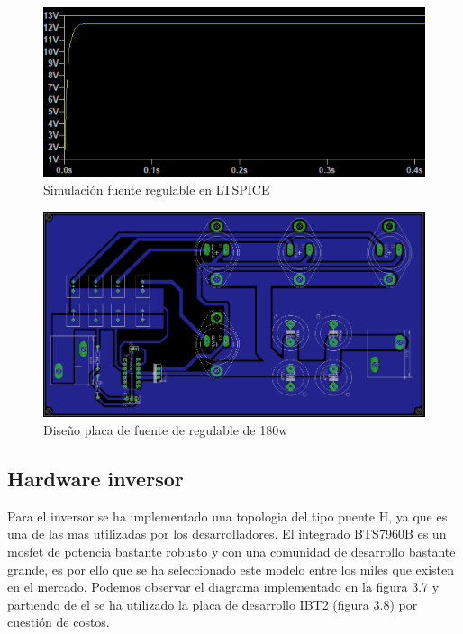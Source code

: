 \begin{figure}[H]
\centering
\includegraphics[width=12cm]{Capitulo3/figs/12v.png}
\caption{Simulación fuente regulable en LTSPICE}
\end{figure}

\begin{figure}[H]
\centering
\includegraphics[width=12cm]{Capitulo3/figs/pcb.png}
\caption{Diseño placa de fuente de regulable de 180w}
\end{figure}





\newpage

\subsection{Hardware inversor}

Para el inversor se ha implementado una topologia del tipo puente H, ya que es una de las mas utilizadas por los desarrolladores. El integrado BTS7960B es un mosfet de potencia bastante robusto y con una comunidad de desarrollo bastante grande, es por ello que se ha seleccionado este modelo entre los miles que existen en el mercado. Podemos observar el diagrama implementado en la figura 3.7 \cite{ibt} y partiendo de el se ha utilizado la placa de desarrollo IBT2 (figura 3.8) por cuestión de costos. \\

